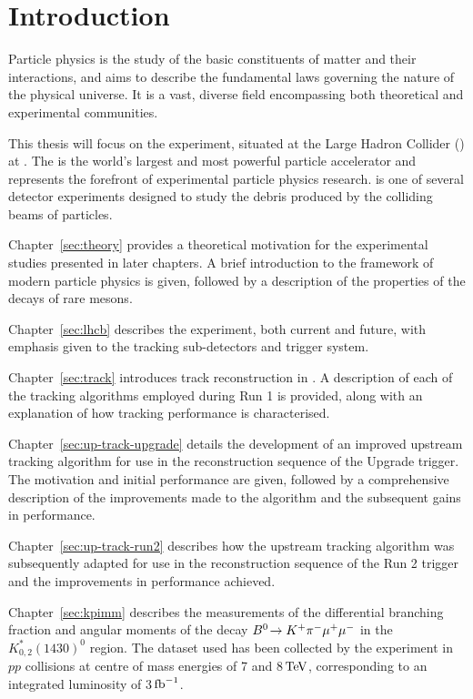 \section{Introduction}
\label{sec:intro}

Particle physics is the study of the basic constituents of matter and their interactions, and aims to describe the fundamental laws governing the nature of the physical universe. It is a vast, diverse field encompassing both theoretical and experimental communities.

This thesis will focus on the \lhcb experiment, situated at the Large Hadron Collider (\lhc) at \cern. The \lhc is the world's largest and most powerful particle accelerator and represents the forefront of experimental particle physics research. \lhcb is one of several detector experiments designed to study the debris produced by the colliding beams of particles.

Chapter~\ref{sec:theory} provides a theoretical motivation for the experimental studies presented in later chapters. A brief introduction to the framework of modern particle physics is given, followed by a description of the properties of the decays of rare \B mesons.

Chapter~\ref{sec:lhcb} describes the \lhcb experiment, both current and future, with emphasis given to the tracking sub-detectors and trigger system.

Chapter~\ref{sec:track} introduces track reconstruction in \lhcb. A description of each of the tracking algorithms employed during \lhcb Run 1 is provided, along with an explanation of how tracking performance is characterised.

Chapter~\ref{sec:up-track-upgrade} details the development of an improved upstream tracking algorithm for use in the reconstruction sequence of the \lhcb Upgrade trigger. The motivation and initial performance are given, followed by a comprehensive description of the improvements made to the algorithm and the subsequent gains in performance. 

Chapter~\ref{sec:up-track-run2} describes how the upstream tracking algorithm was subsequently adapted for use in the reconstruction sequence of the \lhcb Run 2 trigger and the improvements in performance achieved.

Chapter~\ref{sec:kpimm} describes the measurements of the differential branching fraction and angular moments of the decay ${B}^0\!\rightarrow K^{+}\pi^{-}\mu^{+}\mu^{-}$ in the $K^{*}_{0,2}(1430)^{0}$ region. The dataset used has been collected by the \lhcb experiment in $pp$ collisions at centre of mass energies of 7 and 8${\mathrm{\,Te\kern -0.1em V}}$, corresponding to an integrated luminosity of 3$\mbox{\,fb}^{-1}$.